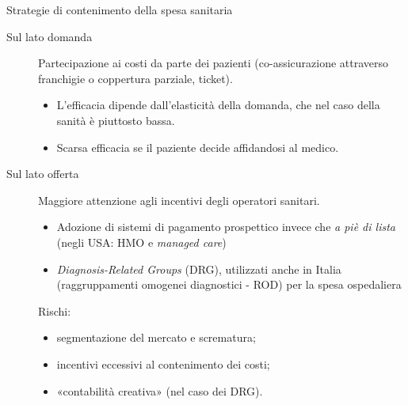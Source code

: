 \documentclass[aspectratio=64,12pt]{beamer}
\begin{document}
\begin{frame}{Strategie di contenimento della spesa sanitaria}
\begin{description}
\item[{Sul lato domanda}] Partecipazione ai costi da parte dei pazienti
(co-assicurazione attraverso franchigie o coppertura parziale, ticket).
\begin{itemize}
\item L'efficacia dipende dall'elasticità della domanda, che nel caso della
sanità è piuttosto bassa.
\item Scarsa efficacia se il paziente decide affidandosi al medico.
\end{itemize}
\item[{Sul lato offerta}] Maggiore attenzione agli incentivi degli operatori
sanitari.
\begin{itemize}
\item Adozione di sistemi di pagamento prospettico invece che \emph{a piè di lista}
(negli USA: HMO e \emph{managed care})
\item \emph{Diagnosis-Related Groups} (DRG), utilizzati anche in Italia
(raggruppamenti omogenei diagnostici - ROD) per la spesa ospedaliera
\end{itemize}
Rischi: 
\begin{itemize}
\item segmentazione del mercato e scrematura;
\item incentivi eccessivi al contenimento dei costi;
\item «contabilità creativa» (nel caso dei DRG).
\end{itemize}
\end{description}
\end{frame}
\end{document}

